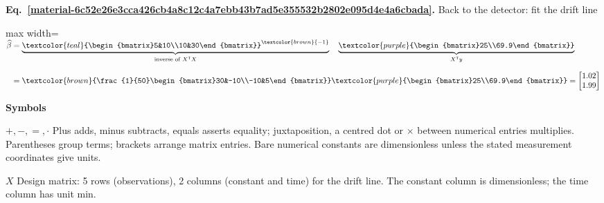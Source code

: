 \documentclass[11pt,a4paper]{article}
\begin{document}
\par\medskip
\noindent\begin{minipage}{\linewidth}
\label{material-6c52e26e3cca426cb4a8c12c4a7ebb43b7ad5e355532b2802e095d4e4a6cbada}
\noindent\textbf{Eq.~\ref*{material-6c52e26e3cca426cb4a8c12c4a7ebb43b7ad5e355532b2802e095d4e4a6cbada}.} Back to the detector: fit the drift line\par\nopagebreak
\begin{center}\begin{adjustbox}{max width=\linewidth}$\displaystyle \begin{aligned}\widehat\beta&=\underbrace{\textcolor{teal}{\begin{bmatrix}5&10\\10&30\end{bmatrix}}^{\textcolor{brown}{-1}}}_{\text{inverse of }X^{\mathsf T}X}\quad\underbrace{\textcolor{purple}{\begin{bmatrix}25\\69.9\end{bmatrix}}}_{X^{\mathsf T}y}\\[.7em]&=\textcolor{brown}{\frac{1}{50}\begin{bmatrix}30&-10\\-10&5\end{bmatrix}}\textcolor{purple}{\begin{bmatrix}25\\69.9\end{bmatrix}}=\begin{bmatrix}1.02\\1.99\end{bmatrix}\end{aligned}$\end{adjustbox}\end{center}

\par\noindent\textbf{Symbols}

\par\noindent\textbf{\(+,-,=,\cdot\)} Plus adds, minus subtracts, equals asserts equality; juxtaposition, a centred dot or \ensuremath{\times} between numerical entries multiplies. Parentheses group terms; brackets arrange matrix entries. Bare numerical constants are dimensionless unless the stated measurement coordinates give units.

\par\noindent\textbf{\(X\)} Design matrix: 5 rows (observations), 2 columns (constant and time) for the drift line. The constant column is dimensionless; the time column has unit min.


\end{minipage}
\end{document}
